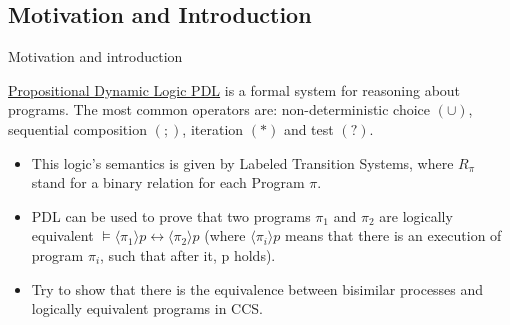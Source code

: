 \subsection{Motivation and Introduction}

\begin{frame}{Motivation and introduction}

\underline{Propositional Dynamic Logic PDL} is a formal system for reasoning about programs. The most common operators are: non-deterministic choice $(\cup)$, sequential composition $(;)$, iteration $(\ast)$ and test $(?)$.

\begin{itemize}
    \item This logic's semantics is given by Labeled Transition Systems, where $R_\pi$ stand for a binary relation for each Program $\pi$.
    
    \item PDL can be used to prove that two programs $\pi_1$ and $\pi_2$ are logically equivalent $\models \langle \pi_1\rangle p \leftrightarrow \langle \pi_2\rangle p$ (where $\langle \pi_i \rangle p$ means that there is an execution of program $\pi_i$, such that after it, p holds). \cite{DBLP:journals/tcs/Benevides17}
    
    \item Try to show that there is the equivalence between bisimilar processes and logically equivalent programs in CCS.
\end{itemize}

\end{frame}